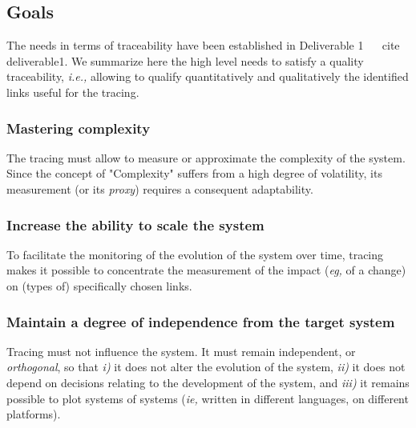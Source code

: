 \pagebreak
\subsection{Goals}
The needs in terms of traceability have been established in Deliverable 1 ~ \ cite {deliverable1}. We summarize here the high level needs to satisfy a quality traceability, \textit{i.e.,} allowing to qualify quantitatively and qualitatively the identified links useful for the tracing.
    
\subsubsection{Mastering complexity}
The tracing must allow to measure or approximate the complexity of the system. Since the concept of "Complexity" suffers from a high degree of volatility, its measurement (or its \textit{proxy}) requires a consequent adaptability.
    
\subsubsection{Increase the ability to scale the system}
To facilitate the monitoring of the evolution of the system over time, tracing makes it possible to concentrate the measurement of the impact (\textit{eg,} of a change) on (types of) specifically chosen links.
    
\subsubsection{Maintain a degree of independence from the target system}
Tracing must not influence the system. It must remain independent, or \textit{orthogonal}, so that \textit{i)} it does not alter the evolution of the system, \textit{ii)} it does not depend on decisions relating to the development of the system, and \textit{iii)} it remains possible to plot systems of systems (\textit{ie,} written in different languages, on different platforms).%

